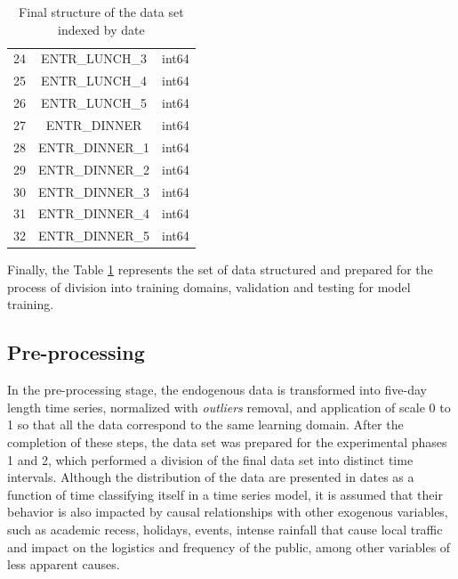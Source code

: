 \begin{table}[!ht]
\begin{tabular}{c|c|c}
                24&	ENTR\_LUNCH\_3				&int64 \\ 
                25&	ENTR\_LUNCH\_4				&int64 \\
                26&	ENTR\_LUNCH\_5				&int64 \\
                27&	ENTR\_DINNER				&	int64 \\ 
                28&	ENTR\_DINNER\_1				&int64\\
                29&	ENTR\_DINNER\_2				&int64 \\ 
                30&	ENTR\_DINNER\_3				&int64 \\ 
                31&	ENTR\_DINNER\_4				&int64 \\
                32&	ENTR\_DINNER\_5				&int64\\
              \hline
            \end{tabular}
            \caption{Final structure of the data set indexed by date
}
            \label{table:dataset_final}
        \end{table}
        Finally, the Table \ref{table:dataset_final} represents the set of data structured and prepared for the process of division into training domains, validation and testing for model training.
        
	\subsection{Pre-processing}
        In the pre-processing stage, the endogenous data is transformed into five-day length time series, normalized with \textit{outliers} removal, and application of scale 0 to 1 so that all the data correspond to the same learning domain. After the completion of these steps, the data set was prepared for the experimental phases 1 and 2, which performed a division of the final data set into distinct time intervals. Although the distribution of the data are presented in dates as a function of time classifying itself in a time series model, it is assumed that their behavior is also impacted by causal relationships with other exogenous variables, such as academic recess, holidays, events, intense rainfall that cause local traffic and impact on the logistics and frequency of the public, among other variables of less apparent causes.
    
